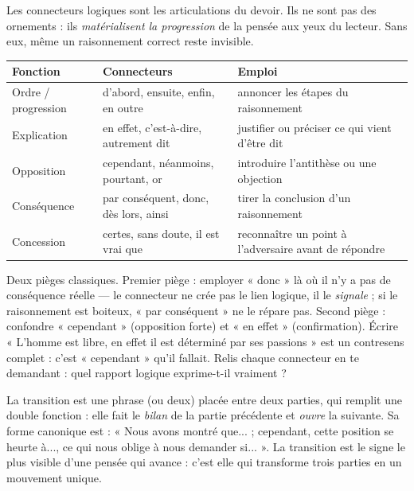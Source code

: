 \documentclass[11pt]{article}
\newcommand{\cle}[1]{{\popxbold\color{popdark}#1}}
\begin{document}
Les \cle{connecteurs logiques} sont les articulations du devoir. Ils ne sont pas des ornements : ils \emph{matérialisent la progression} de la pensée aux yeux du lecteur. Sans eux, même un raisonnement correct reste invisible.

\begin{center}
\begin{tabularx}{\linewidth}{|l|X|X|}
\hline
\rowcolor{popblueL}
\textbf{Fonction} & \textbf{Connecteurs} & \textbf{Emploi} \\
\hline
Ordre / progression & d'abord, ensuite, enfin, en outre & annoncer les étapes du raisonnement \\
\hline
Explication & en effet, c'est-à-dire, autrement dit & justifier ou préciser ce qui vient d'être dit \\
\hline
Opposition & cependant, néanmoins, pourtant, or & introduire l'antithèse ou une objection \\
\hline
Conséquence & par conséquent, donc, dès lors, ainsi & tirer la conclusion d'un raisonnement \\
\hline
Concession & certes, sans doute, il est vrai que & reconnaître un point à l'adversaire avant de répondre \\
\hline
\end{tabularx}
\end{center}

\begin{attention}
Deux pièges classiques. Premier piège : employer « donc » là où il n'y a pas de conséquence réelle — le connecteur ne crée pas le lien logique, il le \emph{signale} ; si le raisonnement est boiteux, « par conséquent » ne le répare pas. Second piège : confondre « cependant » (opposition forte) et « en effet » (confirmation). Écrire « L'homme est libre, en effet il est déterminé par ses passions » est un contresens complet : c'est « cependant » qu'il fallait. Relis chaque connecteur en te demandant : quel rapport logique exprime-t-il vraiment ?
\end{attention}

La \cle{transition} est une phrase (ou deux) placée entre deux parties, qui remplit une double fonction : elle fait le \emph{bilan} de la partie précédente et \emph{ouvre} la suivante. Sa forme canonique est : « Nous avons montré que... ; cependant, cette position se heurte à..., ce qui nous oblige à nous demander si... ». La transition est le signe le plus visible d'une pensée qui avance : c'est elle qui transforme trois parties en un mouvement unique.
\end{document}
